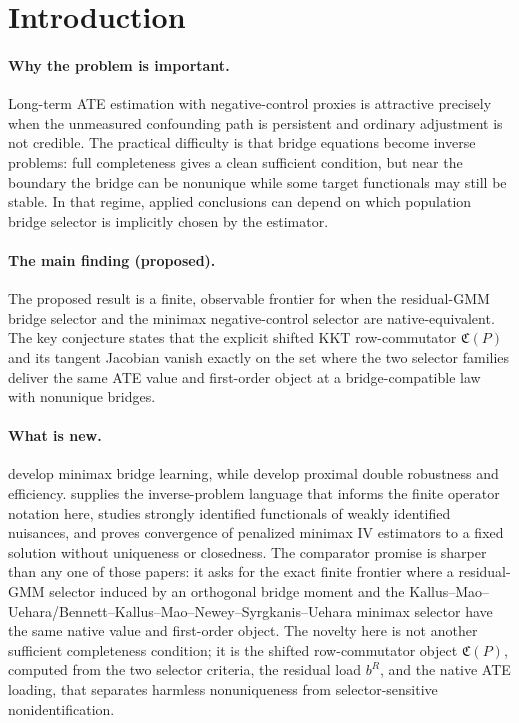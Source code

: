 \documentclass[11pt]{article}
\theoremstyle{definition}
\theoremstyle{plain}
\theoremstyle{remark}
\begin{document}
\section{Introduction}
\paragraph{Why the problem is important.}
Long-term ATE estimation with negative-control proxies is attractive precisely when the unmeasured confounding path is persistent and ordinary adjustment is not credible. The practical difficulty is that bridge equations become inverse problems: full completeness gives a clean sufficient condition, but near the boundary the bridge can be nonunique while some target functionals may still be stable. In that regime, applied conclusions can depend on which population bridge selector is implicitly chosen by the estimator.

\paragraph{The main finding (proposed).}
The proposed result is a finite, observable frontier for when the residual-GMM bridge selector and the minimax negative-control selector are native-equivalent. The key conjecture states that the explicit shifted KKT row-commutator \(\mathfrak C(P)\) and its tangent Jacobian vanish exactly on the set where the two selector families deliver the same ATE value and first-order object at a bridge-compatible law with nonunique bridges.

\paragraph{What is new.}
\citet[Sections 3--4]{KallusMaoUehara2021} develop minimax bridge learning, while \citet[Section 3, Theorems 3.1--3.2]{CuiPuShiMiaoTchetgen2024} develop proximal double robustness and efficiency. \citet{MastouriZhuGultchinEtAl2021} supplies the inverse-problem language that informs the finite operator notation here, \citet{BennettKallusMaoNeweySyrgkanisUehara2023COLT} studies strongly identified functionals of weakly identified nuisances, and \citet{BennettKallusMaoNeweySyrgkanisUehara2023MinimaxIV} proves convergence of penalized minimax IV estimators to a fixed solution without uniqueness or closedness. The comparator promise is sharper than any one of those papers: it asks for the exact finite frontier where a residual-GMM selector induced by an orthogonal bridge moment and the Kallus--Mao--Uehara/Bennett--Kallus--Mao--Newey--Syrgkanis--Uehara minimax selector have the same native value and first-order object. The novelty here is not another sufficient completeness condition; it is the shifted row-commutator object \(\mathfrak C(P)\), computed from the two selector criteria, the residual load \(b^R\), and the native ATE loading, that separates harmless nonuniqueness from selector-sensitive nonidentification.
\end{document}
